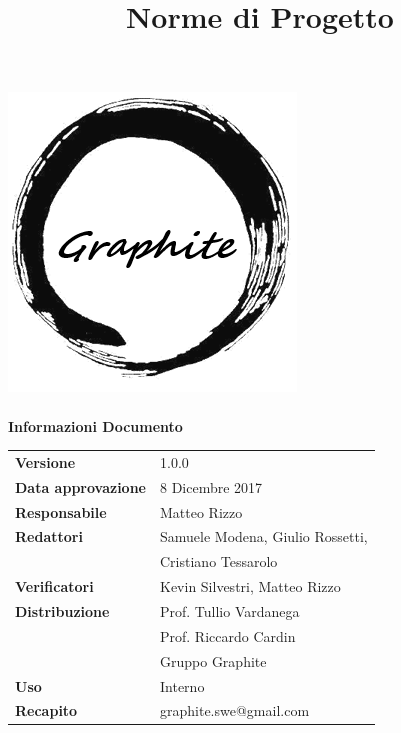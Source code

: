 \documentclass[openany,12pt,a4paper]{report}
\title{Norme di Progetto}
\author{}
\newcommand{\versione}{1.0.0}
\begin{document}
	\makeatletter
	\begin{titlepage}
		\setlength{\headsep}{0pt}  
		\begin{center}			
			\includegraphics[width=0.5\linewidth]{logo.png}\\[1em]
			{\huge \bfseries  \@title }\\[10ex]
			\textbf{\Large Informazioni Documento} \\[2em]
			\bgroup
			\def\arraystretch{1.5}
			\begin{tabular}{l|l}
				\textbf{Versione} & \versione{} \\
				\textbf{Data approvazione} & 8 Dicembre 2017 \\
				\textbf{Responsabile} & Matteo Rizzo \\
				\textbf{Redattori} & Samuele Modena, Giulio Rossetti,\\ 
				& Cristiano Tessarolo \\
				\textbf{Verificatori} & Kevin Silvestri, Matteo Rizzo \\
				\textbf{Distribuzione} & Prof. Tullio Vardanega \\
				 & Prof. Riccardo Cardin \\
				 & Gruppo Graphite \\
				\textbf{Uso} & Interno \\
				\textbf{Recapito} & graphite.swe@gmail.com \\
			\end{tabular}
		\egroup
		\end{center}
	\end{titlepage}
	\makeatother

	\thispagestyle{empty}
	\newpage
			
	
	
	\tableofcontents
	
	
	
	
	
	
	
	
	
\end{document}
